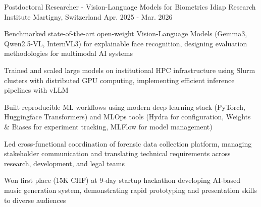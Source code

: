 

\begin{cventries}

\cventry
    {Postdoctoral Researcher - Vision-Language Models for Biometrics} %
    {Idiap Research Institute} %
    {Martigny, Switzerland} %
    {Apr. 2025 - Mar. 2026} %
    {
      \begin{cvitems} %
        \item {Benchmarked state-of-the-art open-weight Vision-Language Models (Gemma3, Qwen2.5-VL, InternVL3) for explainable face recognition, designing evaluation methodologies for multimodal AI systems}
        \item {Trained and scaled large models on institutional HPC infrastructure using Slurm clusters with distributed GPU computing, implementing efficient inference pipelines with vLLM}
        \item {Built reproducible ML workflows using modern deep learning stack (PyTorch, Huggingface Transformers) and MLOps tools (Hydra for configuration, Weights \& Biases for experiment tracking, MLFlow for model management)}
        \item {Led cross-functional coordination of forensic data collection platform, managing stakeholder communication and translating technical requirements across research, development, and legal teams}
        \item {Won first place (15K CHF) at 9-day startup hackathon developing AI-based music generation system, demonstrating rapid prototyping and presentation skills to diverse audiences}
      \end{cvitems}
    }


\end{cventries}
